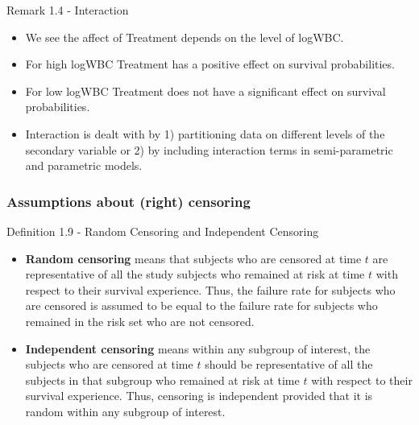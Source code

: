 \documentclass{beamer}
\theoremstyle{definition}
\begin{document}
\begin{frame}
\begin{block}{Remark 1.4 - Interaction}
\begin{itemize}
\item We see the affect of Treatment depends on the level of logWBC.
\item For high logWBC Treatment has a positive effect on survival probabilities.
\item For low logWBC Treatment does not have a significant effect on survival probabilities.
\item Interaction is dealt with by 1) partitioning data on different levels of the secondary variable or 2) by including interaction terms in semi-parametric and parametric models.
\end{itemize}
\end{block}
\end{frame}


\begin{frame}
\frametitle{Assumptions about (right) censoring}
\begin{block}{Definition 1.9 - Random Censoring and Independent Censoring}
\begin{itemize}
\item \textbf{Random censoring} means that subjects who are censored at
time $t$ are representative of all the study subjects who remained at risk at time $t$ with respect to their survival experience. Thus, the failure rate for subjects who are
censored is assumed to be equal to the failure rate for subjects who remained in the risk set who are not censored.
\item \textbf{Independent censoring} means within any subgroup of interest, the subjects who are censored at time $t$ should be representative of all the subjects in that subgroup who remained at risk at time $t$ with respect to their survival experience. Thus, censoring is independent provided that it is random within any subgroup of interest.
\end{itemize}
\end{block}
\end{frame}
\end{document}
